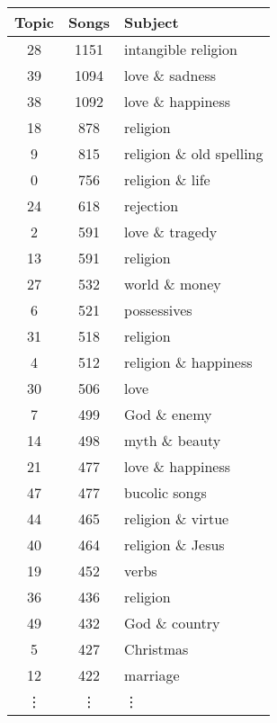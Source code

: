 \begin{table}
	\begin{minipage}{0.5\textwidth}
		\begin{tabular}{ccl}
			\toprule
			Topic & Songs & Subject \\
			\midrule
			28             &  1151 & intangible religion \\
			39             &  1094 & love \& sadness \\
			38             &  1092 & love \& happiness \\
			18             &   878 & religion \\
			9              &   815 & religion \& old spelling \\
			0              &   756 & religion \& life \\
			24             &   618 & rejection \\
			2              &   591 & love \& tragedy \\
			13             &   591 & religion \\
			27             &   532 & world \& money \\
			6              &   521 & possessives \\
			31             &   518 & religion \\
			4              &   512 & religion \& happiness \\
			30             &   506 & love \\
			7              &   499 & God \& enemy \\
			14             &   498 & myth \& beauty \\
			21             &   477 & love \& happiness \\
			47             &   477 & bucolic songs \\
			44             &   465 & religion \& virtue \\
			40             &   464 & religion \& Jesus\\
			19             &   452 & verbs \\
			36             &   436 & religion \\
			49             &   432 & God \& country \\
			5              &   427 & Christmas \\
			12             &   422 & marriage \\
			\vdots & \vdots & \vdots \\
			\bottomrule
		\end{tabular}
	\end{minipage} \hfill

\end{table}
